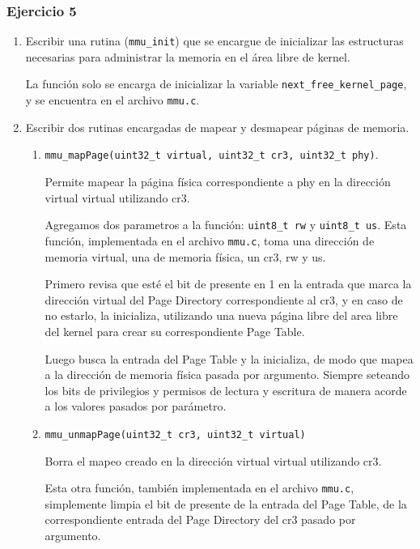 \documentclass[a4paper]{article}
\begin{document}
 \subsubsection{Ejercicio 5}
 
 \begin{enumerate}[label=\alph*)]
 	\item Escribir una rutina (\texttt{mmu\_init}) que se encargue de inicializar las estructuras necesarias para administrar la memoria en el área libre de kernel.
 	
 	La función solo se encarga de inicializar la variable \texttt{next\_free\_kernel\_page},
 	y se encuentra en el archivo \texttt{mmu.c}.
 	
 		\item Escribir dos rutinas encargadas de mapear y desmapear páginas de memoria.
 	\begin{enumerate}[label=\Roman{*}-]
 		\item \texttt{mmu\_mapPage(uint32\_t virtual, uint32\_t cr3, uint32\_t phy)}.
 		
 		Permite mapear la página f\'isica correspondiente a phy en la dirección virtual virtual	utilizando cr3.
 		
 		Agregamos dos parametros a la funci\'on: \texttt{uint8\_t rw} y \texttt{uint8\_t us}. Esta función, implementada en el archivo \texttt{mmu.c}, toma una dirección de memoria virtual,
 		una de memoria f\'isica, un cr3, rw y us. 
 		
 		Primero revisa que esté el bit de presente en 1 en la
 		entrada que marca la dirección virtual del Page Directory correspondiente al cr3, y en 
 		caso de no estarlo, la inicializa, utilizando una nueva página libre del area libre del kernel para crear
 		su correspondiente Page Table. 
 		
 		Luego busca la entrada del Page Table  y la	inicializa, de modo que mapea a la dirección de memoria f\'isica pasada por argumento. Siempre seteando los bits de privilegios y permisos de lectura y escritura de manera acorde a los valores pasados por par\'ametro.
 		
 		\item \texttt{mmu\_unmapPage(uint32\_t cr3, uint32\_t virtual)}
 		
 		Borra el mapeo creado en la dirección virtual virtual utilizando cr3.
 		
 		Esta otra función, también implementada en el archivo \texttt{mmu.c}, simplemente limpia el bit de presente de la entrada del Page Table, de la correspondiente entrada del Page Directory del cr3 pasado por argumento.
 		

\end{enumerate}
\end{enumerate}
\end{document}

